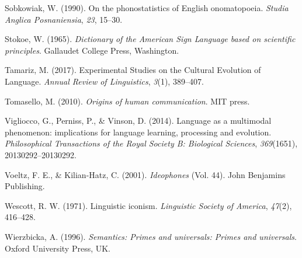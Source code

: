 \documentclass[english,floatsintext,man]{apa6}
\theoremstyle{definition}
\theoremstyle{definition}
\theoremstyle{definition}
\theoremstyle{remark}
\begin{document}
\leavevmode\hypertarget{ref-Sobkowiak:1990ph}{}%
Sobkowiak, W. (1990). On the phonostatistics of English onomatopoeia.
\emph{Studia Anglica Posnaniensia}, \emph{23}, 15--30.

\leavevmode\hypertarget{ref-Stokoe:1965}{}%
Stokoe, W. (1965). \emph{Dictionary of the American Sign Language based
on scientific principles}. Gallaudet College Press, Washington.

\leavevmode\hypertarget{ref-Tamariz:2017bd}{}%
Tamariz, M. (2017). Experimental Studies on the Cultural Evolution of
Language. \emph{Annual Review of Linguistics}, \emph{3}(1), 389--407.

\leavevmode\hypertarget{ref-Tomasello:2010or}{}%
Tomasello, M. (2010). \emph{Origins of human communication}. MIT press.

\leavevmode\hypertarget{ref-Vigliocco:2014fc}{}%
Vigliocco, G., Perniss, P., \& Vinson, D. (2014). Language as a
multimodal phenomenon: implications for language learning, processing
and evolution. \emph{Philosophical Transactions of the Royal Society B:
Biological Sciences}, \emph{369}(1651), 20130292--20130292.

\leavevmode\hypertarget{ref-Voeltz:2001vv}{}%
Voeltz, F. E., \& Kilian-Hatz, C. (2001). \emph{Ideophones} (Vol. 44).
John Benjamins Publishing.

\leavevmode\hypertarget{ref-Wescott:1971to}{}%
Wescott, R. W. (1971). Linguistic iconism. \emph{Linguistic Society of
America}, \emph{47}(2), 416--428.

\leavevmode\hypertarget{ref-Wierzbicka:1996sm}{}%
Wierzbicka, A. (1996). \emph{Semantics: Primes and universals: Primes
and universals}. Oxford University Press, UK.


\clearpage
\renewcommand{\listtablename}{Table captions}
\listoftables

\clearpage
\renewcommand{\listfigurename}{Figure captions}
\listoffigures

\theendnotes
\end{document}
